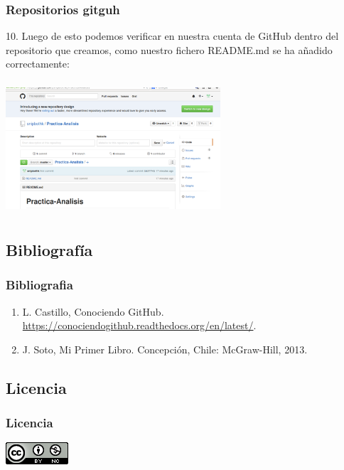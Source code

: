 \documentclass{beamer}
\begin{document}
	\begin{frame}
		\frametitle{Repositorios gitguh}
		{\small 10. Luego de esto podemos verificar en nuestra cuenta de GitHub dentro del repositorio que creamos, como nuestro fichero README.md se ha añadido correctamente:}
		\begin{center}\includegraphics[width=8cm, height=5cm]{10.png}\end{center}
	\end{frame}
	
\subsection{Bibliografía}
\begin{frame}
\frametitle{Bibliografia}
	\begin{enumerate}
		\item L. Castillo, Conociendo GitHub. \url{https://conociendogithub.readthedocs.org/en/latest/}.
		\item J. Soto, Mi Primer Libro.  Concepción, Chile: McGraw-Hill, 2013.
	\end{enumerate}
\end{frame}

\subsection{Licencia}
\begin{frame}
\frametitle{Licencia}
\begin{center}
\href{http://www.google.com}{\includegraphics[scale=.8]{cc}}
\end{center}
\end{frame}

\MuchasGraciasFrame
\end{document}
